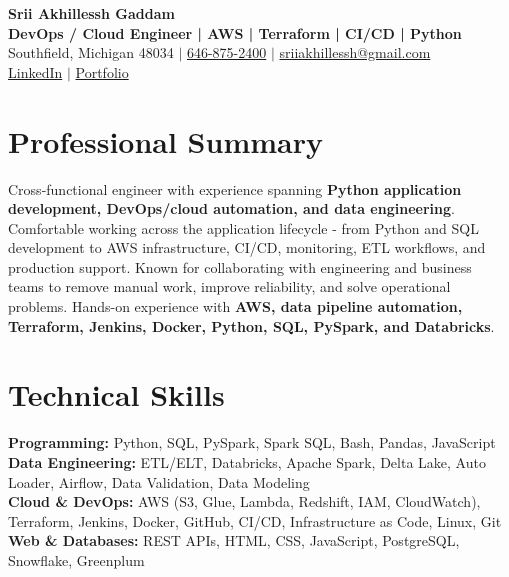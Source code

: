 \documentclass[letterpaper,10pt]{article}
\begin{document}
\fontsize{9.35pt}{10.45pt}\selectfont

\begin{center}
    {\LARGE \textbf{Srii Akhillessh Gaddam}} \\[-1pt]
    \textbf{DevOps / Cloud Engineer | AWS | Terraform | CI/CD | Python} \\[2pt]
    Southfield, Michigan 48034 $|$
    \href{tel:6468752400}{646-875-2400} $|$
    \href{mailto:sriiakhillessh@gmail.com}{sriiakhillessh@gmail.com} \\[1pt]
    \href{https://www.linkedin.com/in/srii-akhiilessh-gaddam-b48668191/}{LinkedIn} $|$
    \href{https://sriiakhillesshg.github.io/portfolio/}{Portfolio}
\end{center}
\vspace{-8pt}

\section{Professional Summary}
\small{Cross-functional engineer with experience spanning \textbf{Python application development, DevOps/cloud automation, and data engineering}. Comfortable working across the application lifecycle - from Python and SQL development to AWS infrastructure, CI/CD, monitoring, ETL workflows, and production support. Known for collaborating with engineering and business teams to remove manual work, improve reliability, and solve operational problems. Hands-on experience with \textbf{AWS, data pipeline automation, Terraform, Jenkins, Docker, Python, SQL, PySpark, and Databricks}.}

\section{Technical Skills}
\small{
\textbf{Programming:} Python, SQL, PySpark, Spark SQL, Bash, Pandas, JavaScript \\
\textbf{Data Engineering:} ETL/ELT, Databricks, Apache Spark, Delta Lake, Auto Loader, Airflow, Data Validation, Data Modeling \\
\textbf{Cloud \& DevOps:} AWS (S3, Glue, Lambda, Redshift, IAM, CloudWatch), Terraform, Jenkins, Docker, GitHub, CI/CD, Infrastructure as Code, Linux, Git \\
\textbf{Web \& Databases:} REST APIs, HTML, CSS, JavaScript, PostgreSQL, Snowflake, Greenplum
}
\end{document}
